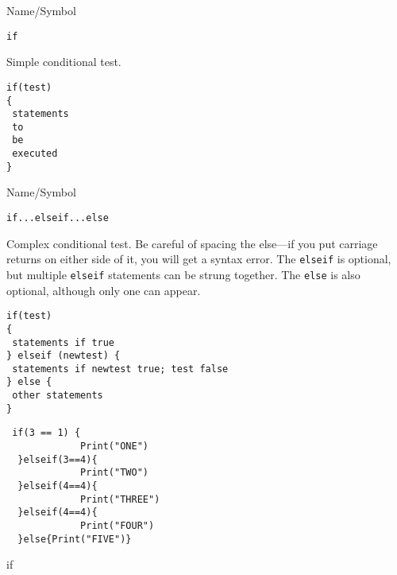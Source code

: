 \vfill
\newpage
{}
\vfill


\begin{desc}{Name/Symbol}
\item[Name/Symbol]	\verb+if+ 

\item[Description]	Simple conditional test.

\item[Usage]
\begin{verbatim}
if(test)
{
 statements
 to
 be 
 executed
}
\end{verbatim}

\item[Example]	

\item[See Also]	
\end{desc}

\vfill

\begin{desc}{Name/Symbol}
\item[Name/Symbol]	\verb+if...elseif...else+            

\item[Description] Complex conditional test.  Be careful of spacing
  the else---if you put carriage returns on either side of it, you
  will get a syntax error. The \verb+elseif+ is optional, but
  multiple \verb+elseif+ statements can be strung together.  The
  \verb+else+ is also optional, although only one can appear.

\item[Usage]
\begin{verbatim}
if(test)
{
 statements if true
} elseif (newtest) {
 statements if newtest true; test false
} else {
 other statements
} 
\end{verbatim}

\item[Example]	
\begin{verbatim}
 if(3 == 1) {
             Print("ONE")
  }elseif(3==4){
             Print("TWO")
  }elseif(4==4){
             Print("THREE")
  }elseif(4==4){
             Print("FOUR")
  }else{Print("FIVE")}
\end{verbatim}
\item[See Also]	
if
\end{desc}


